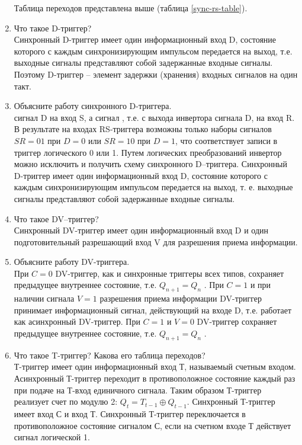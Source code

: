 \begin{enumerate}
Таблица переходов представлена выше (таблица \ref{sync-rs-table}).
	\item Что такое D-триггер? \\
	Синхронный D-триггер имеет один информационный вход D, состояние
которого с каждым синхронизирующим импульсом передается на выход,
т.е. выходные сигналы представляют собой задержанные входные
сигналы. Поэтому D-триггер – элемент задержки (хранения) входных
сигналов на один такт.
	\item Объясните работу синхронного D-триггера. \\
	сигнал D на вход S, а сигнал , т.е. с выхода инвертора сигнала D, на вход
R. В результате на входах RS-триггера возможны только наборы сигналов
$SR = 01$ при $D=0$ или $SR =10$ при $D=1$, что соответствует записи в триггер
логического 0 или 1. Путем логических преобразований инвертор можно
исключить и получить схему синхронного D–триггера. Синхронный
D-триггер имеет один информационный вход D, состояние которого с
каждым синхронизирующим импульсом передается на выход, т. е.
выходные сигналы представляют собой задержанные входные сигналы.
	\item Что такое DV–триггер? \\
	Синхронный DV-триггер имеет один информационный
вход D и один подготовительный разрешающий вход V для разрешения
приема информации.
	\item Объясните работу DV-триггера. \\
	При $C = 0$ DV-триггер, как и синхронные триггеры всех типов, сохраняет
предыдущее внутреннее состояние, т.е. $Q_{n+1} = Q_n$ . При $C = 1$ и при наличии
сигнала $V = 1$ разрешения приема информации DV-триггер принимает
информационный сигнал, действующий на входе D, т.е. работает как
асинхронный DV-триггер. При $C = 1$ и $V = 0$ DV-триггер сохраняет
предыдущее внутреннее состояние, т.е. $Q_{n+1} = Q_n$ .
	\item Что такое T-триггер? Какова его таблица переходов? \\
	Т-триггер имеет один информационный вход Т, называемый счетным
входом. Асинхронный Т-триггер переходит в противоположное состояние
каждый раз при подаче на Т-вход единичного сигнала. Таким образом
Т-триггер реализует счет по модулю 2: $Q_t = T_{t-1} \oplus Q_{t-1}$. Синхронный Т-триггер имеет
вход С и вход Т. Синхронный Т-триггер переключается в
противоположное состояние сигналом С, если на счетном входе Т
действует сигнал логической 1.



\end{enumerate}
